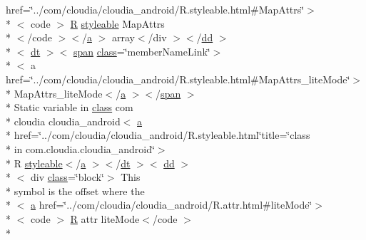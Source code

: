 \begin{DoxyCompactItemize}
href=\char`\"{}../com/cloudia/cloudia\-\_\-android/R.\-styleable.\-html\#Map\-Attrs\char`\"{}$>$\\*
$<$ code $>$ \hyperlink{index-16_8html_a31e8fe59be5c20ce90a0090e28a0c1fe}{R} \hyperlink{index-17_8html_ae6c9bf1e41380184b4b665ca9ab6ba0a}{styleable} Map\-Attrs\\*
$<$/code $>$$<$/\hyperlink{style_8css_a5e8981582017bb8b84c21f148345d1f7}{a} $>$ array$<$/div $>$$<$/\hyperlink{stylesheet_8css_a47f4718a86835a7771ec592ece845221}{dd} $>$\\*
$<$ \hyperlink{stylesheet_8css_a107565fb4039d33b041380d6e0ea1d80}{dt} $>$$<$ \hyperlink{stylesheet_8css_a8343996ebcf16220b04e54659aac31cc}{span} \hyperlink{_tools_8html_acf06f836132665ba8114f5a414c2403f}{class}=\char`\"{}member\-Name\-Link\char`\"{}$>$\\*
$<$ a href=\char`\"{}../com/cloudia/cloudia\-\_\-android/R.\-styleable.\-html\#Map\-Attrs\-\_\-lite\-Mode\char`\"{}$>$\\*
 Map\-Attrs\-\_\-lite\-Mode$<$/\hyperlink{style_8css_a5e8981582017bb8b84c21f148345d1f7}{a} $>$$<$/\hyperlink{stylesheet_8css_a8343996ebcf16220b04e54659aac31cc}{span} $>$\\*
 Static variable in \hyperlink{_tools_8html_acf06f836132665ba8114f5a414c2403f}{class} com \\*
cloudia cloudia\-\_\-android$<$ \hyperlink{style_8css_a5e8981582017bb8b84c21f148345d1f7}{a} \\*
href=\char`\"{}../com/cloudia/cloudia\-\_\-android/R.\-styleable.\-html\char`\"{}title=\char`\"{}class \\*
in com.\-cloudia.\-cloudia\-\_\-android\char`\"{}$>$\\*
 R \hyperlink{index-17_8html_ae6c9bf1e41380184b4b665ca9ab6ba0a}{styleable}$<$/\hyperlink{style_8css_a5e8981582017bb8b84c21f148345d1f7}{a} $>$$<$/\hyperlink{stylesheet_8css_a107565fb4039d33b041380d6e0ea1d80}{dt} $>$$<$ \hyperlink{stylesheet_8css_a47f4718a86835a7771ec592ece845221}{dd} $>$\\*
$<$ div \hyperlink{_tools_8html_acf06f836132665ba8114f5a414c2403f}{class}=\char`\"{}block\char`\"{}$>$ This \\*
symbol is the offset where the\\*
$<$ \hyperlink{style_8css_a5e8981582017bb8b84c21f148345d1f7}{a} href=\char`\"{}../com/cloudia/cloudia\-\_\-android/R.\-attr.\-html\#lite\-Mode\char`\"{}$>$\\*
$<$ code $>$ \hyperlink{index-16_8html_a31e8fe59be5c20ce90a0090e28a0c1fe}{R} attr lite\-Mode$<$/code $>$\\*

\end{DoxyCompactItemize}

